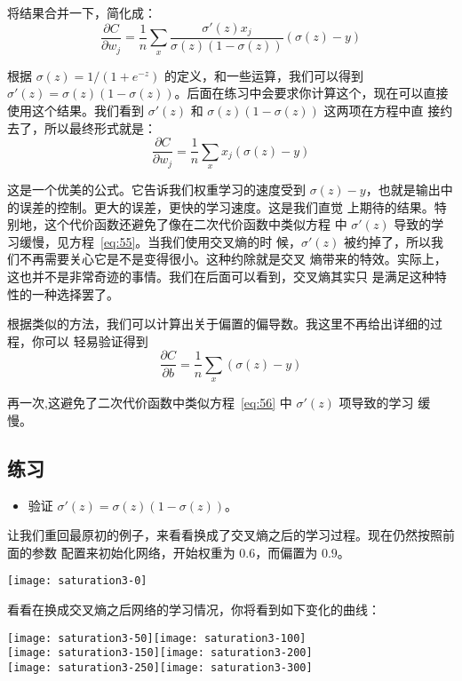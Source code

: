 将结果合并一下，简化成：
\begin{equation}
  \frac{\partial C}{\partial w_j} = \frac{1}{n} \sum_x \frac{\sigma'(z)
    x_j}{\sigma(z) (1-\sigma(z))} (\sigma(z)-y)
\label{eq:60}\tag{60}
\end{equation}

根据 $\sigma(z) = 1/(1+e^{-z})$ 的定义，和一些运算，我们可以得到
$\sigma'(z) = \sigma(z)(1-\sigma(z))$。后面在练习中会要求你计算这个，现在可以直接
使用这个结果。我们看到 $\sigma'(z)$ 和 $\sigma(z)(1-\sigma(z))$ 这两项在方程中直
接约去了，所以最终形式就是：
\begin{equation}
  \frac{\partial C}{\partial w_j} =  \frac{1}{n} \sum_x x_j(\sigma(z)-y)
\label{eq:61}\tag{61}
\end{equation}

这是一个优美的公式。它告诉我们权重学习的速度受到
$\sigma(z)-y$，也就是输出中的误差的控制。更大的误差，更快的学习速度。这是我们直觉
上期待的结果。特别地，这个代价函数还避免了像在二次代价函数中类似方程
中 $\sigma'(z)$ 导致的学习缓慢，见方程~\eqref{eq:55}。当我们使用交叉熵的时
候，$\sigma'(z)$ 被约掉了，所以我们不再需要关心它是不是变得很小。这种约除就是交叉
熵带来的特效。实际上，这也并不是非常奇迹的事情。我们在后面可以看到，交叉熵其实只
是满足这种特性的一种选择罢了。

根据类似的方法，我们可以计算出关于偏置的偏导数。我这里不再给出详细的过程，你可以
轻易验证得到
\begin{equation}
  \frac{\partial C}{\partial b} = \frac{1}{n} \sum_x (\sigma(z)-y)
\label{eq:62}\tag{62}
\end{equation}

再一次,这避免了二次代价函数中类似方程~\eqref{eq:56} 中 $\sigma'(z)$ 项导致的学习
缓慢。

\subsection*{练习}

\begin{itemize}
\item 验证 $\sigma'(z) = \sigma(z)(1-\sigma(z))$。
\end{itemize}

让我们重回最原初的例子，来看看换成了交叉熵之后的学习过程。现在仍然按照前面的参数
配置来初始化网络，开始权重为 $0.6$，而偏置为 $0.9$。
\begin{center}
  \texttt{[image: saturation3-0]}
\end{center}
看看在换成交叉熵之后网络的学习情况，你将看到如下变化的曲线：
\begin{center}
  \texttt{[image: saturation3-50]}\texttt{[image: saturation3-100]}\\
  \texttt{[image: saturation3-150]}\texttt{[image: saturation3-200]}\\
  \texttt{[image: saturation3-250]}\texttt{[image: saturation3-300]}
\end{center}

